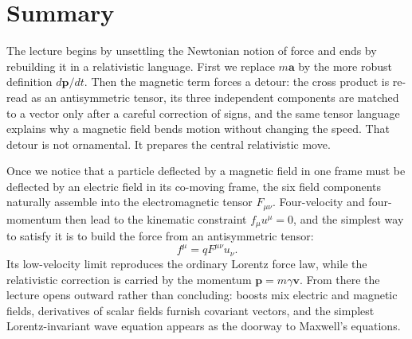\section{Summary}

The lecture begins by unsettling the Newtonian notion of force and ends by rebuilding it in a relativistic language. First we replace \(m\mathbf a\) by the more robust definition \(d\mathbf p/dt\). Then the magnetic term forces a detour: the cross product is re-read as an antisymmetric tensor, its three independent components are matched to a vector only after a careful correction of signs, and the same tensor language explains why a magnetic field bends motion without changing the speed. That detour is not ornamental. It prepares the central relativistic move.

Once we notice that a particle deflected by a magnetic field in one frame must be deflected by an electric field in its co-moving frame, the six field components naturally assemble into the electromagnetic tensor \(F_{\mu\nu}\). Four-velocity and four-momentum then lead to the kinematic constraint \(f_\mu u^\mu=0\), and the simplest way to satisfy it is to build the force from an antisymmetric tensor:
\begin{equation}
f^\mu=qF^{\mu\nu}u_\nu.
\end{equation}
Its low-velocity limit reproduces the ordinary Lorentz force law, while the relativistic correction is carried by the momentum \(\mathbf p=m\gamma\mathbf v\). From there the lecture opens outward rather than concluding: boosts mix electric and magnetic fields, derivatives of scalar fields furnish covariant vectors, and the simplest Lorentz-invariant wave equation appears as the doorway to Maxwell's equations.